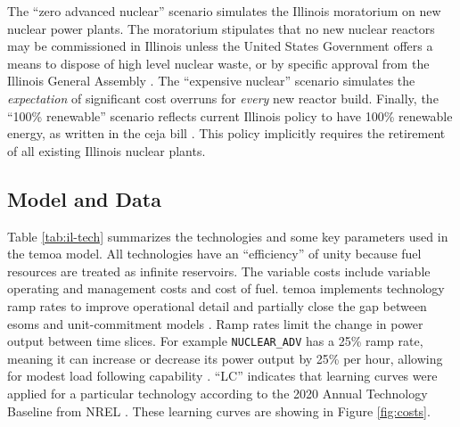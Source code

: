 \begin{table}[H]
  \centering
  \caption{Summary of Illinois Case Study Scenarios}
  \label{tab:il-scenarios}
\end{table}

The ``zero advanced nuclear'' scenario simulates the Illinois moratorium on new nuclear
power plants. The moratorium stipulates that no new nuclear reactors may be
commissioned in Illinois unless the United States Government offers a means to
dispose of high level nuclear waste, or by specific approval from the Illinois
General Assembly \cite{shea_states_2021}. The ``expensive nuclear'' scenario
simulates the \textit{expectation} of significant cost overruns for \textit{every}
new reactor build. Finally, the ``100\% renewable'' scenario reflects current
Illinois policy to have 100\% renewable energy, as written in the \gls{ceja} bill
\cite{harmon_climate_2021}. This policy implicitly requires the retirement of
all existing Illinois nuclear plants.

\subsection{Model and Data}

Table \ref{tab:il-tech} summarizes the technologies and some key parameters
used in the \gls{temoa} model. All technologies have an ``efficiency'' of unity
because fuel resources are treated as infinite reservoirs. The variable costs
include variable operating and management costs and cost of fuel. \gls{temoa}
implements technology ramp rates to improve operational detail and partially
close the gap between \glspl{esom} and unit-commitment models \cite{de_queiroz_repurposing_2019}.
Ramp rates limit the change in power output between time slices. For example
\texttt{NUCLEAR\_ADV} has a 25\% ramp rate, meaning it can increase or decrease
its power output by 25\% per hour, allowing for modest load following capability
\cite{baseload_2017,lokhov_technical_2011}. ``LC'' indicates that learning
curves were applied for a particular technology according to the 2020 Annual Technology
Baseline from NREL \cite{nrel_2020_2020}. These learning curves are showing in
Figure \ref{fig:costs}.

